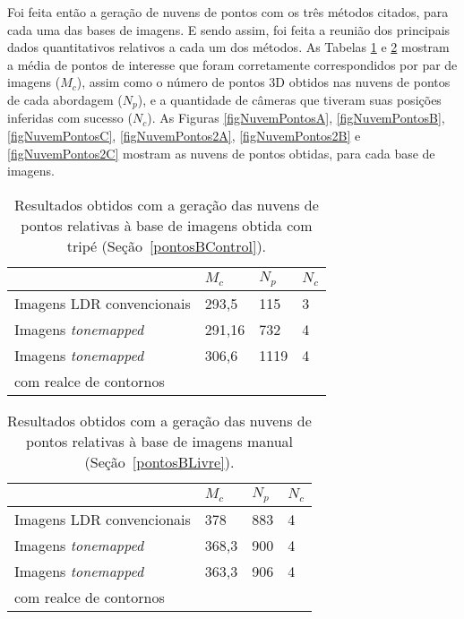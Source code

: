 Foi feita então a geração de nuvens de pontos com os três métodos citados, para cada uma das bases de imagens. E sendo assim, foi feita a reunião dos principais dados quantitativos relativos a cada um dos métodos. As Tabelas \ref{tabResultados} e \ref{tabResultados2} mostram a média de pontos de interesse que foram corretamente correspondidos por par de imagens ($M_c$), assim como o número de pontos 3D obtidos nas nuvens de pontos de cada abordagem ($N_p$), e a quantidade de câmeras que tiveram suas posições inferidas com sucesso ($N_c$). As Figuras \ref{figNuvemPontosA}, \ref{figNuvemPontosB},\ref{figNuvemPontosC}, \ref{figNuvemPontos2A}, \ref{figNuvemPontos2B} e \ref{figNuvemPontos2C} mostram as nuvens de pontos obtidas, para cada base de imagens.

\begin{table}[H]
  \centering
  \caption{Resultados obtidos com a geração das nuvens de pontos relativas à base de imagens obtida com tripé (Seção~\protect\ref{pontosBControl}).}
  \label{tabResultados}
  \begin{tabular}{l|l|l|l}
    \hline
               & $M_c$ &  $N_p$ & $N_c$ \\
    \hline
    Imagens LDR convencionais & 293,5 & 115 & 3 \\
    \hline
    Imagens \textit{tonemapped} & 291,16 & 732 & 4 \\  
    \hline
    Imagens \textit{tonemapped} & 306,6 & 1119 & 4 \\
    com realce de contornos & & & \\  
    \hline
  \end{tabular}
\end{table}

\begin{table}[H]
  \centering
  \caption{Resultados obtidos com a geração das nuvens de pontos relativas à base de imagens manual (Seção~\protect\ref{pontosBLivre}).}
  \label{tabResultados2}
  \begin{tabular}{l|l|l|l}
    \hline
               & $M_c$ &  $N_p$ & $N_c$ \\
    \hline
    Imagens LDR convencionais & 378 & 883 & 4 \\
    \hline
    Imagens \textit{tonemapped} & 368,3 & 900 & 4 \\  
    \hline
    Imagens \textit{tonemapped} & 363,3 & 906 & 4 \\
    com realce de contornos & & & \\  
    \hline
  \end{tabular}
\end{table}

